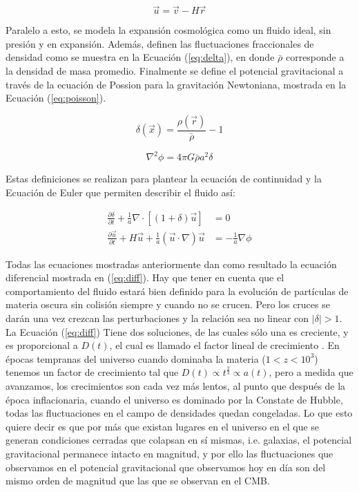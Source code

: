 \begin{equation}
\vec{u}=\vec{v}-H\vec{r}
\label{eq:peculiar}
\end{equation}

Paralelo a esto, se modela la expansión cosmológica como un fluido ideal, sin presión y en expansión. Además, definen las fluctuaciones fraccionales de densidad como se muestra en la Ecuación (\ref{eq:delta}), en donde $\bar{\rho}$ corresponde a la densidad de masa promedio. Finalmente se define el potencial gravitacional a través de la ecuación de Possion para la gravitación Newtoniana, mostrada en la Ecuación (\ref{eq:poisson}).

\begin{equation}
\delta(\vec{x})=\frac{\rho(\vec{r})}{\bar{\rho}}-1
\label{eq:delta}
\end{equation}


\begin{equation}
\nabla^{2}\phi=4\pi G\bar{\rho}a^{2}\delta
\label{eq:poisson}
\end{equation}


Estas definiciones se realizan para plantear la ecuación de continuidad y la Ecuación de Euler que permiten describir el fluido así:

\begin{align}
\frac{\partial\delta}{\partial t}+\frac{1}{a}\nabla\cdot[(1+\delta)\vec{u}]&=0 \\
\frac{\partial\vec{u}}{\partial t}+H\vec{u}+\frac{1}{a}(\vec{u}\cdot\nabla)\vec{u}&=-\frac{1}{a}\nabla\phi
\end{align}

Todas las ecuaciones mostradas anteriormente dan como resultado la ecuación diferencial mostrada en (\ref{eq:diff}). Hay que tener en cuenta que el comportamiento del fluido estará bien definido para la evolución de partículas de materia oscura sin colisión siempre y cuando no se crucen. Pero los cruces se darán una vez crezcan las perturbaciones y la relación sea no linear con $|\delta|>1$. La Ecuación (\ref{eq:diff}) Tiene dos soluciones, de las cuales sólo una es creciente, y es proporcional a $D(t)$, el cual es llamado el factor lineal de crecimiento \cite{knobel}. En épocas tempranas del universo cuando dominaba la materia ($1<z<10^{3}$) tenemos un factor de crecimiento tal que $D(t) \propto t^{\frac{2}{3}}\propto a(t)$, pero a medida que avanzamos, los crecimientos son cada vez más lentos, al punto que después de la época inflacionaria, cuando el universo es dominado por la Constate de Hubble, todas las fluctuaciones en el campo de densidades quedan congeladas. Lo que esto quiere decir es que por más que existan lugares en el universo en el que se generan condiciones cerradas que colapsan en sí mismas, i.e. galaxias, el potencial gravitacional permanece intacto en magnitud, y por ello las fluctuaciones que observamos en el potencial gravitacional que observamos hoy en día son del mismo orden de magnitud que las que se observan en el CMB.

